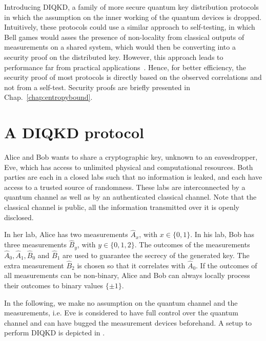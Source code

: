 \medbreak

Introducing \acrfull{DIQKD}, a family of more secure quantum key distribution protocols in which the assumption on the inner working of the quantum devices is dropped.
Intuitively, these protocols could use a similar approach to self-testing, in which Bell games would asses the presence of non-locality from classical outputs of measurements on a shared system, which would then be converting into a security proof on the distributed key.
However, this approach leads to performance far from practical applications~\cite{Fu2018,Kundu2022}.
Hence, for better efficiency, the security proof of most protocols is directly based on the observed correlations and not from a self-test.
Security proofs are briefly presented in Chap.~\ref{chap:entropybound}.


\section{A DIQKD protocol}

Alice and Bob wants to share a cryptographic key, unknown to an eavesdropper, Eve, which has access to unlimited physical and computational resources.
Both parties are each in a closed labs such that no information is leaked, and each have access to a trusted source of randomness.
These labs are interconnected by a quantum channel as well as by an authenticated classical channel.
Note that the classical channel is public, all the information transmitted over it is openly disclosed.

In her lab, Alice has two measurements $\hat{A}_x$, with $x\in \{0,1\}$.
In his lab, Bob has three measurements $\hat{B}_y$, with $y \in \{0,1,2\}$.
The outcomes of the measurements $\hat{A}_0,\hat{A}_1,\hat{B}_0$ and $\hat{B}_1$ are used to guarantee the secrecy of the generated key.
The extra measurement $\hat{B}_2$ is chosen so that it correlates with $\hat{A}_0$.
If the outcomes of all measurements can be non-binary, Alice and Bob can always locally process their outcomes to binary values $\{\pm1\}$.

In the following, we make no assumption on the quantum channel and the measurements, i.e. Eve is considered to have full control over the quantum channel and can have bugged the measurement devices beforehand.
A setup to perform DIQKD is depicted in .

\medbreak

